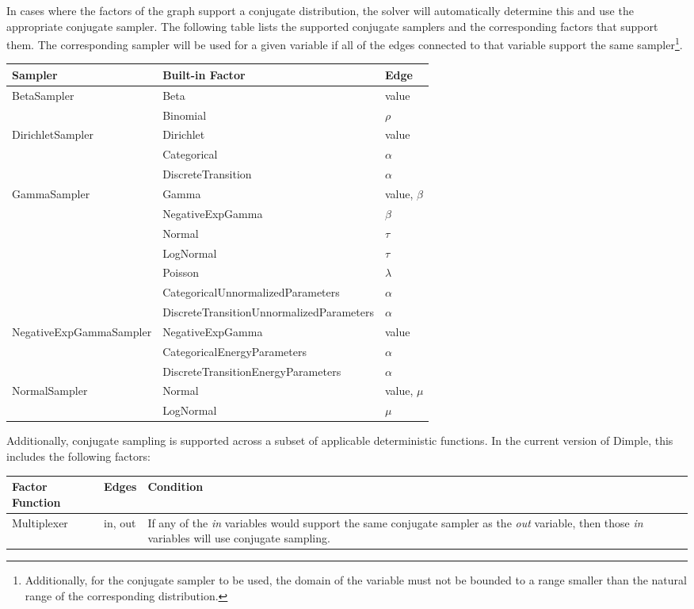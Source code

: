 In cases where the factors of the graph support a conjugate distribution, the solver will automatically determine this and use the appropriate conjugate sampler.  The following table lists the supported conjugate samplers and the corresponding factors that support them.  The corresponding sampler will be used for a given variable if all of the edges connected to that variable support the same sampler\footnote{Additionally, for the conjugate sampler to be used, the domain of the variable must not be bounded to a range smaller than the natural range of the corresponding distribution.}.

\begin{longtable} {l p{7.1cm} p{2.5cm}}
Sampler & Built-in Factor & Edge \\
\hline
\endhead
BetaSampler & Beta & value \\
 & Binomial & $\rho$ \\
DirichletSampler & Dirichlet & value \\
 & Categorical & $\alpha$ \\
 & DiscreteTransition & $\alpha$ \\
GammaSampler & Gamma & value, $\beta$ \\
 & NegativeExpGamma & $\beta$ \\
 & Normal & $\tau$ \\
 & LogNormal & $\tau$ \\
 & Poisson & $\lambda$ \\
 & CategoricalUnnormalizedParameters & $\alpha$ \\
 & DiscreteTransitionUnnormalizedParameters & $\alpha$ \\
NegativeExpGammaSampler & NegativeExpGamma & value \\
 & CategoricalEnergyParameters & $\alpha$ \\ 
 & DiscreteTransitionEnergyParameters & $\alpha$ \\ 
NormalSampler & Normal & value, $\mu$ \\
 & LogNormal & $\mu$ \\
\end{longtable}

Additionally, conjugate sampling is supported across a subset of applicable deterministic functions.  In the current version of Dimple, this includes the following factors:

\begin{longtable} {l p{2cm} p{9cm}}
Factor Function & Edges & Condition \\
\hline
\endhead
Multiplexer & in, out & If any of the \emph{in} variables would support the same conjugate sampler as the \emph{out} variable, then those \emph{in} variables will use conjugate sampling. \\
\end{longtable}


